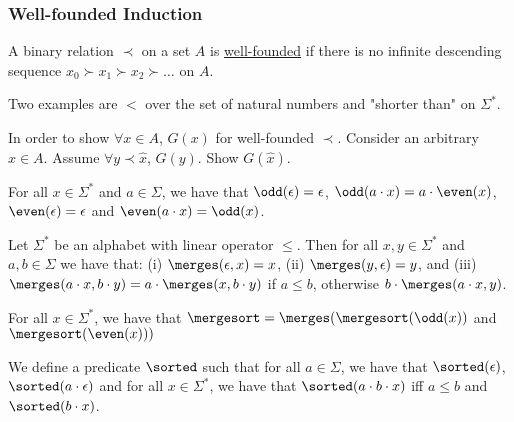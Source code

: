 \subsubsection{Well-founded Induction}

\begin{definition} A binary relation $\prec$ on a set $A$ is  \underline{well-founded} if there is no infinite descending sequence $x_0 \succ x_1 \succ x_2 \succ \ldots$ on $A$.
\end{definition}

\begin{example} Two examples are $<$ over the set of natural numbers and "shorter than" on $\Sigma^*$.
\end{example}


\begin{remark}
 In order to show $\forall x\in A$, $G(x)$ for well-founded $\prec$. Consider an arbitrary $\hat{x} \in A$.
Assume $\forall y \prec \hat{x}$, $G(y)$.
Show $G(\hat{x})$.
\end{remark}

\begin{definition} For all $x \in \Sigma^*$ and $a \in \Sigma$, we have that $\odd(\epsilon) = \epsilon$, $\odd(a\cdot x) = a\cdot \even(x)$, $\even(\epsilon) = \epsilon$ and $\even(a\cdot x) = \odd(x)$.
\end{definition}


\begin{definition}[$\merges$] Let $\Sigma^*$ be an alphabet with linear operator $\leq$. Then for all $x,y \in \Sigma^*$ and $a,b \in \Sigma$ we have that: (i) $\merges(\epsilon, x) = x$, (ii) $\merges(y, \epsilon) = y$, and (iii) $\merges(a\cdot x, b\cdot y) = a\cdot \merges(x, b\cdot y)$ if $a \leq b$, otherwise $b\cdot \merges(a\cdot x, y)$.
\end{definition}

\begin{definition}[$\mergesort$] For all $x \in \Sigma^*$, we have that $\mergesort = \merges(\mergesort(\odd(x))$ and  $\mergesort(\even(x)))$
\end{definition}

\begin{definition}[$\sorted$] We define a predicate $\sorted$ such that for all $a \in \Sigma$, we have that $\sorted(\epsilon)$, $\sorted(a\cdot\epsilon)$ and for all $x\in \Sigma^*$, we have that $\sorted(a\cdot b\cdot x)$ iff $a\leq b$ and $\sorted(b\cdot x)$.
\end{definition}

